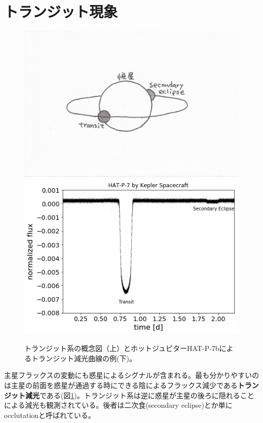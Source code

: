\section{トランジット現象 \label{ss:transit}}

\begin{figure}[]
 \begin{center}
	\includegraphics[width=\linewidth]{fig/transit.jpg}
	\includegraphics[width=\linewidth]{fig/Hatp7.png}
 \end{center}
 \caption{トランジット系の概念図（上）とホットジュピターHAT-P-7bによるトランジット減光曲線の例(下)。\label{fig:hatp7b}}
\end{figure} 

主星フラックスの変動にも惑星によるシグナルが含まれる。最も分かりやすいのは主星の前面を惑星が通過する時にできる陰によるフラックス減少である{\bf トランジット減光}である(図\ref{fig:hatp7b})。トランジット系は逆に惑星が主星の後ろに隠れることによる減光も観測されている。後者は二次食(secondary eclipse)とか単にocclutationと呼ばれている。


